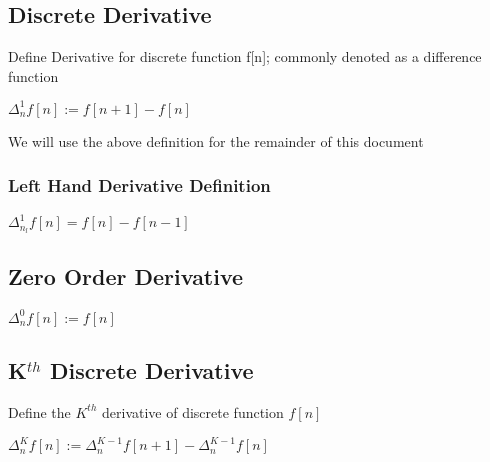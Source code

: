 \documentclass[11pt]{article}
\begin{document}
\subsection{Discrete Derivative}
Define Derivative for discrete function f[n]; commonly denoted as a difference function
\begin{center}
$
\Delta_n^1 f[n] := f[n+1] - f[n]
$
\end{center}
\vspace{1mm}
We will use the above definition for the remainder of this document \\


\subsubsection{Left Hand Derivative Definition}
\begin{center}
\vspace{1mm}
$
\Delta_{n_l}^1 f[n] = f[n] - f[n-1]
$
\end{center}


\subsection{Zero Order Derivative}
\begin{center}
\vspace{1mm}
$
\Delta_n^0 f[n] := f[n]
$
\end{center}



\subsection{K$^{th}$ Discrete Derivative}
Define the $K^{th}$ derivative of discrete function $f[n]$
\begin{center}
\vspace{1mm}
$
\Delta_n^K f[n] := \Delta_n^{K-1} f[n+1] - \Delta_n^{K-1} f[n]
$
\end{center}
\end{document}
